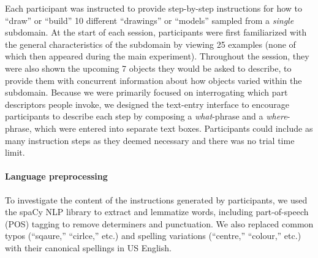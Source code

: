 Each participant was instructed to provide step-by-step instructions for how to ``draw'' or ``build'' 10 different ``drawings'' or ``models'' sampled from a \textit{single} subdomain.
At the start of each session, participants were first familiarized with the general characteristics of the subdomain by viewing 25 examples (none of which then appeared during the main experiment).
Throughout the session, they were also shown the upcoming 7 objects they would be asked to describe, to provide them with concurrent information about how objects varied within the subdomain.
Because we were primarily focused on interrogating which part descriptors people invoke, we designed the text-entry interface to encourage participants to describe each step by composing a \textit{what}-phrase and a \textit{where}-phrase, which were entered into separate text boxes. 
Participants could include as many instruction steps as they deemed necessary and there was no trial time limit.


\paragraph{Language preprocessing} %
To investigate the content of the instructions generated by participants, we used the spaCy NLP library to extract and lemmatize words, including part-of-speech (POS) tagging to remove determiners and punctuation. We also replaced common typos (``sqaure,'' ``cirlce,'' etc.) and spelling variations (``centre,'' ``colour,'' etc.) with their canonical spellings in US English.

